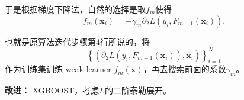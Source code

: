 
\begin{frame}

于是根据梯度下降法，自然的选择是取$f_m$使得
$$f_m(\mathbf{x}_i) = -\gamma_m \partial_2 L(y_i, F_{m-1}(\mathbf{x}_i)).$$

也就是原算法迭代步骤第4行所说的，将
$$\left\{(\partial_2 L(y_i, F_{m-1}(\mathbf{x}_i)), \mathbf{x}_i) \right\}_{i=1}^N$$
作为训练集训练 weak learner $f_m(\mathbf{x})$，再去搜索前面的系数$\gamma_m$。

\vspace{2em}
\pause

{\bfseries 改进：} XGBOOST，考虑$L$的二阶泰勒展开。

\end{frame}















